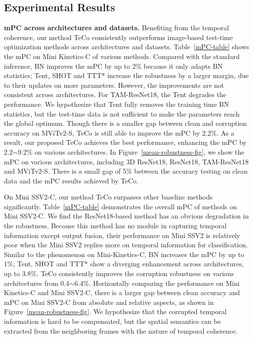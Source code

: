 \documentclass{article} %
\begin{document}
\subsection{Experimental Results}
\textbf{mPC across architectures and datasets.}
Benefiting from the temporal coherence, our method TeCo consistently outperforms image-based test-time optimization methods across architectures and datasets. Table~\ref{mPC-table} shows the mPC on Mini Kinetics-C of various methods. Compared with the standard inference, BN improves the mPC by up to 2\% because it only adapts BN statistics; Tent, SHOT and TTT* increase the robustness by a larger margin, due to their updates on more parameters. However, the improvements are not consistent across architectures. For TAM-ResNet18, the Tent degrades the performance. We hypothesize that Tent fully removes the training time BN statistics, but the test-time data is not sufficient to make the parameters reach the global optimum.  
Though there is a smaller gap between clean and corruption accuracy on MViTv2-S, TeCo is still able to improve the mPC by 2.2\%.
As a result, our proposed TeCo achieves the best performance, enhancing the mPC by 2.2$\sim$9.2\% on various architectures.
In Figure~\ref{mean-robustness-fig}, we show the mPC on various architectures, including 3D ResNet18, ResNet18, TAM-ResNet18 and MViTv2-S. There is a small gap of 5\% between the accuracy testing on clean data and the mPC results achieved by TeCo.

On Mini SSV2-C, our method TeCo surpasses other baseline methods significantly. Table~\ref{mPC-table} demonstrates the overall mPC of methods on Mini SSV2-C. We find the ResNet18-based method has an obvious degradation in the robustness.
Because this method has no module in capturing temporal information except output fusion, their performance on Mini SSV2 is relatively poor when the Mini SSV2 replies more on temporal information for classification. 
Similar to the phenomenon on Mini-Kinetics-C, BN increases the mPC by up to 1\%; Tent, SHOT and TTT* show a diverging enhancement across architectures, up to 3.8\%.
TeCo consistently improves the corruption robustness on various architectures from 0.4$\sim$6.4\%.
Horizontally comparing the performance on Mini Kinetics-C and Mini SSV2-C, there is a larger gap between clean accuracy and mPC on Mini SSV2-C from absolute and relative aspects, as shown in Figure~\ref{mean-robustness-fig}. 
We hypothesize that the corrupted temporal information is hard to be compensated, but the spatial semantics can be extracted from the neighboring frames with the nature of temporal coherence.
\end{document}
